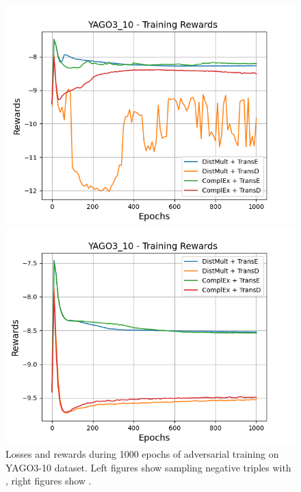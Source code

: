 \begin{figure}[H]
\begin{minipage}{.5\textwidth}
    \end{minipage}
    \begin{minipage}{.5\textwidth}
      \centering
      \includegraphics[width=0.9\linewidth]{figures/results/gan_train/not_pretrained/uncertainty/max/entropy/yago3_10/1k_epochs/uncertainty_yago3_10_rew.png}
    \end{minipage}%
    \begin{minipage}{.5\textwidth}
      \centering
      \includegraphics[width=0.9\linewidth]{figures/results/gan_train/not_pretrained/uncertainty/max_distribution/entropy/yago3_10/1k_epochs/uncertainty_yago3_10_rew.png}
    \end{minipage}%
    \caption{Losses and rewards during 1000 epochs of adversarial training on \textsc{YAGO3-10} dataset. 
    Left figures show sampling negative triples with \usmax, right figures show \ussoftmax.}
    \label{fig:advtrain_yago3_10_usmax_ussoftmax_losses_rewards}
\end{figure}